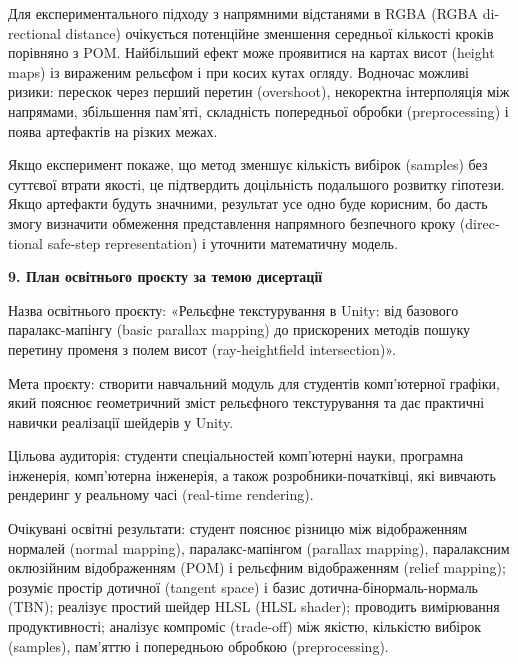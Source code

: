 \documentclass[14pt,a4paper]{extarticle}
\newcommand{\eng}[1]{\foreignlanguage{english}{#1}}
\newcommand{\sectiontitle}[1]{%
  \par\vspace{\baselineskip}%
  \noindent\textbf{#1}\par
}
\begin{document}
Для експериментального підходу з напрямними відстанями в RGBA (\eng{RGBA directional distance}) очікується потенційне зменшення середньої кількості кроків порівняно з POM. Найбільший ефект може проявитися на картах висот (\eng{height maps}) із вираженим рельєфом і при косих кутах огляду. Водночас можливі ризики: перескок через перший перетин (\eng{overshoot}), некоректна інтерполяція між напрямами, збільшення пам'яті, складність попередньої обробки (\eng{preprocessing}) і поява артефактів на різких межах.

Якщо експеримент покаже, що метод зменшує кількість вибірок (\eng{samples}) без суттєвої втрати якості, це підтвердить доцільність подальшого розвитку гіпотези. Якщо артефакти будуть значними, результат усе одно буде корисним, бо дасть змогу визначити обмеження представлення напрямного безпечного кроку (\eng{directional safe-step representation}) і уточнити математичну модель.

\sectiontitle{9. План освітнього проєкту за темою дисертації}

Назва освітнього проєкту: «Рельєфне текстурування в Unity: від базового паралакс-мапінгу (\eng{basic parallax mapping}) до прискорених методів пошуку перетину променя з полем висот (\eng{ray-heightfield intersection})».

Мета проєкту: створити навчальний модуль для студентів комп'ютерної графіки, який пояснює геометричний зміст рельєфного текстурування та дає практичні навички реалізації шейдерів у Unity.

Цільова аудиторія: студенти спеціальностей комп'ютерні науки, програмна інженерія, комп'ютерна інженерія, а також розробники-початківці, які вивчають рендеринг у реальному часі (\eng{real-time rendering}).

Очікувані освітні результати: студент пояснює різницю між відображенням нормалей (\eng{normal mapping}), паралакс-мапінгом (\eng{parallax mapping}), паралаксним оклюзійним відображенням (POM) і рельєфним відображенням (\eng{relief mapping}); розуміє простір дотичної (\eng{tangent space}) і базис дотична-бінормаль-нормаль (TBN); реалізує простий шейдер HLSL (\eng{HLSL shader}); проводить вимірювання продуктивності; аналізує компроміс (\eng{trade-off}) між якістю, кількістю вибірок (\eng{samples}), пам'яттю і попередньою обробкою (\eng{preprocessing}).
\end{document}
